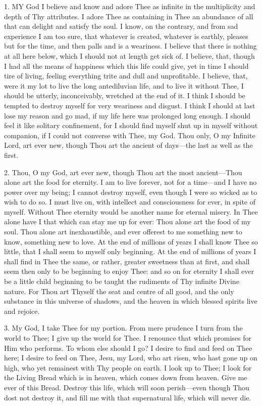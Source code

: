 
1. MY
God I believe and know and adore Thee as infinite in the multiplicity
and depth of Thy attributes. I adore Thee as containing in Thee an
abundance of all that can delight and satisfy the soul. I know, on the
contrary, and from sad experience I am too sure, that whatever is
created, whatever is earthly, pleases but for the time, and then palls
and is a weariness. I believe that there is nothing at all here below,
which I should not at length get sick of. I believe, that, though I had
all the means of happiness which this life could give, yet in time I
should tire of living, feeling everything trite and dull and
unprofitable. I believe, that, were it my lot to live the long
antediluvian life, and to live it without Thee, I should be utterly,
inconceivably, wretched at the end of it. I think I should be tempted to
destroy myself for very weariness and disgust. I think I should at last
lose my reason and go mad, if my life here was prolonged long enough. I
should feel it like solitary confinement, for I should find myself shut
up in myself without companion, if I could not converse with Thee, my
God. Thou only, O my Infinite Lord, art ever new, though Thou art
the ancient of days—the last as well as the first.

2. Thou, O my God, art ever new,
though Thou art the most ancient—Thou alone art the food for eternity.
I am to live forever, not for a time—and I have no power over my
being; I cannot destroy myself, even though I were so wicked as to wish
to do so. I must live on, with intellect and consciousness for ever, in
spite of myself. Without Thee eternity would be another name for eternal
misery. In Thee alone have I that which can stay me up for ever: Thou
alone art the food of my soul. Thou alone art inexhaustible, and ever
offerest to me something new to know, something new to love. At the end
of millions of years I shall know Thee so little, that I shall seem to
myself only beginning. At the end of millions of years I shall find in
Thee the same, or rather, greater sweetness than at first, and shall
seem then only to be beginning to enjoy Thee: and so on for eternity I
shall ever be a little child beginning to be taught the rudiments of Thy
infinite Divine nature. For Thou art Thyself the seat and centre of all
good, and the only substance in this universe of shadows, and the heaven
in which blessed spirits live and rejoice.

3. My God, I take Thee for my
portion. From mere prudence I turn from the world to Thee; I give up the
world for Thee. I renounce that which promises for Him who performs. To
whom else should I go? I desire to find and feed on Thee here; I
desire to feed on Thee, Jesu, my Lord, who art risen, who hast gone up
on high, who yet remainest with Thy people on earth. I look up to Thee;
I look for the Living Bread which is in heaven, which comes down from
heaven. Give me ever of this Bread. Destroy this life, which will soon
perish—even though Thou dost not destroy it, and fill me with that
supernatural life, which will never die.

